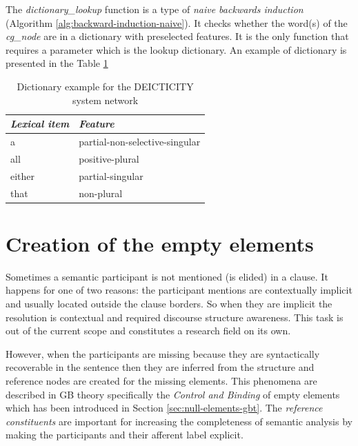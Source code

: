 The \textit{dictionary\_lookup} function is a type of \textit{naive backwards induction} (Algorithm \ref{alg:backward-induction-naive}). It checks whether the word(s) of the \textit{cg\_node} are in a dictionary with preselected features. It is the only function that requires a parameter which is the lookup dictionary. An example of dictionary is presented in the Table \ref{tab:lookup-dict-example}

\begin{table}[!ht]
    \centering
    \begin{tabular}{|l|l|}
        \hline
        \textit{Lexical item} & \textit{Feature}               \\ \hline
        a                     & partial-non-selective-singular \\ \hline
        all                   & positive-plural                \\ \hline
        either                & partial-singular               \\ \hline
        that                  & non-plural                     \\ \hline
    \end{tabular}
    \caption{Dictionary example for the DEICTICITY system network}
    \label{tab:lookup-dict-example}
\end{table}


\section{Creation of the empty elements}
\label{sec:creation-empty-elements}
Sometimes a semantic participant is not mentioned (is elided) in a clause. It happens for one of two reasons: the participant mentions are contextually implicit and usually located outside the clause borders. So when they are implicit the resolution is contextual and required discourse structure awareness. This task is out of the current scope and constitutes a research field on its own. 

However, when the participants are missing because they are syntactically recoverable in the sentence then they are inferred from the structure and reference nodes are created for the missing elements. This phenomena are described in GB theory specifically the \textit{Control and Binding} of empty elements \citep{Haegeman1991} which has been introduced in Section \ref{sec:null-elements-gbt}. The \textit{reference constituents} are important for increasing the completeness of semantic analysis by making the participants and their afferent label explicit.

